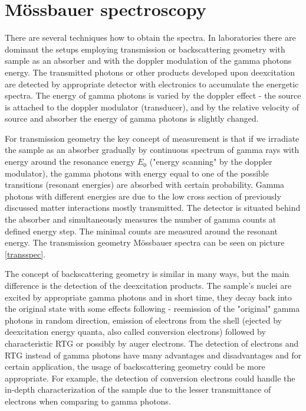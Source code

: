 \section{Mössbauer spectroscopy}
There are several techniques how to obtain the spectra. In laboratories there are dominant the setups employing transmission or backscattering geometry with sample as an absorber and with the doppler modulation of the gamma photons energy. The transmitted photons or other products developed upon deexcitation are detected by appropriate detector with electronics to accumulate the energetic spectra. The energy of gamma photons is varied by the doppler effect - the source is attached to the doppler modulator (transducer), and by the relative velocity of source and absorber the energy of gamma photons is slightly changed.
\par
For transmission geometry the key concept of measurement is that if we irradiate the sample as an absorber gradually by continuous spectrum of gamma rays with energy around the resonance energy $E_0$ ("energy scanning" by the doppler modulator), the gamma photons with energy equal to one of the possible transitions (resonant energies) are absorbed with certain probability. Gamma photons with different energies are due to the low cross section of previously discussed matter interactions mostly transmitted. The detector is situated behind the absorber and simultaneously measures the number of gamma counts at defined energy step. The minimal counts are measured around the resonant energy. The transmission geometry Mössbauer spectra can be seen on picture \ref{transspec}.

\par
The concept of backscattering geometry is similar in many ways, but the main difference is the detection of the deexcitation products. The sample's nuclei are excited by appropriate gamma photons and in short time, they decay back into the original state with some effects following - reemission of the "original" gamma photons in random direction, emission of electrons from the shell (ejected by deexcitation energy quanta, also called conversion electrons) followed by characteristic RTG or possibly by auger electrons. The detection of electrons and RTG instead of gamma photons have many advantages and disadvantages and for certain application, the usage of backscattering geometry could be more appropriate. For example, the detection of conversion electrons could handle the in-depth characterization of the sample due to the lesser transmittance of electrons when comparing to gamma photons.


